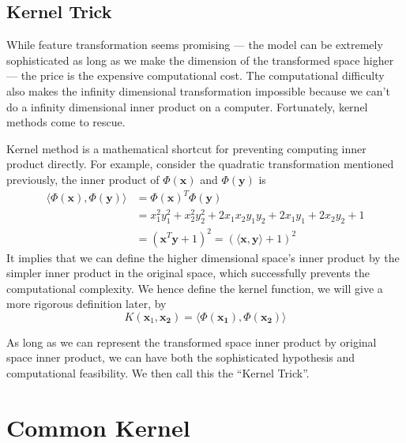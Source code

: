 \documentclass[12pt]{article}
\theoremstyle{definition}
\theoremstyle{remark}
\begin{document}
\subsection{Kernel Trick}
While feature transformation seems promising --- the model can be extremely sophisticated as long as we make the dimension of the transformed space higher --- the price is the expensive computational cost. The computational difficulty also makes the infinity dimensional transformation impossible because we can't do a infinity dimensional inner product on a computer. Fortunately, kernel methods come to rescue.

Kernel method is a mathematical shortcut for preventing computing inner product directly. For example, consider the quadratic transformation mentioned previously, the inner product of \(\Phi(\mathbf{x})\) and \(\Phi(\mathbf{y})\) is
\begin{align*}
  \langle \Phi(\mathbf{x}), \Phi(\mathbf{y}) \rangle &= {\Phi(\mathbf{x})}^T \Phi(\mathbf{y}) \\
      &= x_1^2 y_1^2 + x_2^2 y_2^2 + 2 x_1 x_2 y_1 y_2 + 2 x_1 y_1 + 2 x_2 y_2 + 1 \\
      &= {(\mathbf{x}^T\mathbf{y} + 1)}^2 = {(\langle \mathbf{x}, \mathbf{y} \rangle + 1)}^2
\end{align*}
It implies that we can define the higher dimensional space's inner product by the simpler inner product in the original space, which successfully prevents the computational complexity. We hence define the kernel function, we will give a more rigorous definition later, by
\[
  K(\mathbf{x}_1, \mathbf{x_2}) = \langle \Phi(\mathbf{x_1}), \Phi(\mathbf{x_2}) \rangle
\]

As long as we can represent the transformed space inner product by original space inner product, we can have both the sophisticated hypothesis and computational feasibility. We then call this the ``Kernel Trick''.

\section{Common Kernel}
\end{document}
